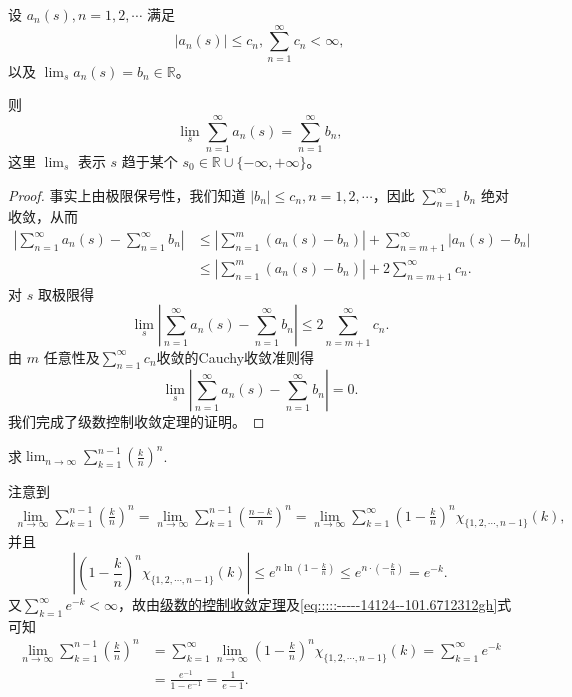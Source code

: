 \documentclass[../../main.tex]{subfiles}
\begin{document}
\begin{theorem}[级数的控制收敛定理]\label{theorem:级数的控制收敛定理}
设 \( a_n(s), n = 1, 2, \cdots \) 满足
\[
|a_n(s)| \leqslant c_n, \sum_{n = 1}^{\infty} c_n < \infty,
\]
以及 \( \lim_{s} a_n(s) = b_n \in \mathbb{R} \)。

则
\[
\lim_{s} \sum_{n = 1}^{\infty} a_n(s) = \sum_{n = 1}^{\infty} b_n,
\]
这里 \( \lim_{s} \) 表示 \( s \) 趋于某个 \( s_0 \in \mathbb{R} \cup \{-\infty, +\infty\} \)。
\end{theorem}
\begin{proof}
事实上由极限保号性，我们知道 \( |b_n| \leqslant c_n, n = 1, 2, \cdots \)，因此 \( \sum_{n = 1}^{\infty} b_n \) 绝对收敛，从而
\begin{align*}
\left| \sum_{n = 1}^{\infty} a_n(s) - \sum_{n = 1}^{\infty} b_n \right| &\leqslant \left| \sum_{n = 1}^{m} (a_n(s) - b_n) \right| + \sum_{n = m + 1}^{\infty} |a_n(s) - b_n| \\
&\leqslant \left| \sum_{n = 1}^{m} (a_n(s) - b_n) \right| + 2 \sum_{n = m + 1}^{\infty} c_n.
\end{align*}
对 \( s \) 取极限得
\[
\lim_{s} \left| \sum_{n = 1}^{\infty} a_n(s) - \sum_{n = 1}^{\infty} b_n \right| \leqslant 2 \sum_{n = m + 1}^{\infty} c_n.
\]
由 \( m \) 任意性及$\sum_{n=1}^{\infty}{c_n}$收敛的Cauchy收敛准则得
\[
\lim_{s} \left| \sum_{n = 1}^{\infty} a_n(s) - \sum_{n = 1}^{\infty} b_n \right| = 0.
\]
我们完成了级数控制收敛定理的证明。

\end{proof}

\begin{example}
求$\lim_{n\rightarrow \infty}\sum_{k=1}^{n-1}\left( \frac{k}{n} \right) ^n$.
\end{example}
\begin{solution}
注意到
\begin{align}
\lim_{n\rightarrow \infty}\sum_{k=1}^{n-1}\left( \frac{k}{n} \right) ^n=\lim_{n\rightarrow \infty}\sum_{k=1}^{n-1}\left( \frac{n-k}{n} \right) ^n\nonumber=\lim_{n\rightarrow \infty}\sum_{k=1}^{\infty}\left( 1-\frac{k}{n} \right) ^n\chi _{\{1,2,\cdots ,n-1\}}(k),\label{eq:::::-----14124--101.6712312gh}
\end{align}
并且
\[
\left| \left( 1-\frac{k}{n} \right) ^n\chi _{\{1,2,\cdots ,n-1\}}(k) \right|\leqslant e^{n\ln \left( 1-\frac{k}{n} \right)}\leqslant e^{n\cdot \left( -\frac{k}{n} \right)}=e^{-k}.
\]
又$\sum_{k=1}^{\infty}e^{-k}<\infty$，故由\hyperref[theorem:级数的控制收敛定理]{级数的控制收敛定理}及\eqref{eq:::::-----14124--101.6712312gh}式可知
\begin{align*}
\lim_{n\rightarrow \infty}\sum_{k=1}^{n-1}\left( \frac{k}{n} \right) ^n&=\sum_{k=1}^{\infty}\lim_{n\rightarrow \infty}\left( 1-\frac{k}{n} \right) ^n\chi _{\{1,2,\cdots ,n-1\}}(k)=\sum_{k=1}^{\infty}e^{-k}
\\
&=\frac{e^{-1}}{1-e^{-1}}=\frac{1}{e-1}.
\end{align*}

\end{solution}
\end{document}
